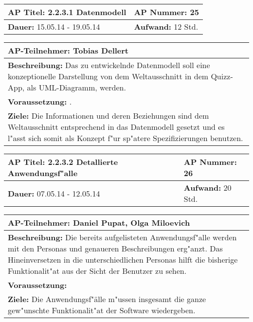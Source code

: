 \begin{tabular}{|p{7.43cm}|p{7.43cm}|}
\hline
\textbf{AP Titel: }2.2.3.1 Datenmodell& \textbf{AP Nummer: }25\\ 
\hline
\textbf{Dauer: }15.05.14 - 19.05.14& \textbf{Aufwand: } 12 Std.\\
\hline
\end{tabular}
\begin{tabular}{|p{15.3cm}|}
\hline
\textbf{AP-Teilnehmer: }Tobias Dellert\\
\hline
\textbf{Beschreibung: }Das zu entwickelnde Datenmodell soll eine konzeptionelle Darstellung von dem Weltausschnitt in dem Quizz-App, als UML-Diagramm, werden.
\\
\hline
\textbf{Voraussetzung: }.\\
\hline 
\textbf{Ziele: }Die Informationen und deren Beziehungen sind dem Weltausschnitt entsprechend in das Datenmodell gesetzt und es l"asst sich somit als Konzept f"ur sp"atere Spezifizierungen benutzen.\\
\hline 
\end{tabular}

\begin{tabular}{|p{7.43cm}|p{7.43cm}|}
\hline
\textbf{AP Titel: }2.2.3.2 Detallierte Anwendungsf"alle& \textbf{AP Nummer: }26\\ 
\hline
\textbf{Dauer: }07.05.14 - 12.05.14& \textbf{Aufwand: } 20 Std.\\
\hline
\end{tabular}
\begin{tabular}{|p{15.3cm}|}
\hline
\textbf{AP-Teilnehmer: }Daniel Pupat, Olga Miloevich\\
\hline
\textbf{Beschreibung: }Die bereits aufgelisteten Anwendungsf"alle werden mit den Personas und genaueren Beschreibungen erg"anzt. Das Hineinversetzen in die unterschiedlichen Personas hilft die bisherige Funktionalit"at aus der Sicht der Benutzer zu sehen.\\
\hline
\textbf{Voraussetzung: }\\
\hline 
\textbf{Ziele: }Die Anwendungsf"älle m"ussen insgesamt die ganze gew"unschte Funktionalit"at der Software wiedergeben.\\
\hline 
\end{tabular}

